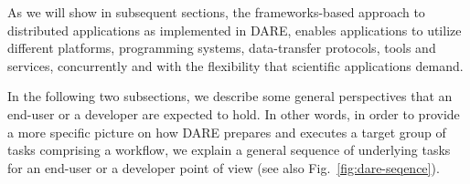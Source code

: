 \documentclass[]{svjour3}
\begin{document}
% 

   

As we will show in subsequent sections, the frameworks-based approach
to distributed applications as implemented in DARE, enables
applications to utilize different platforms, programming systems,
data-transfer protocols, tools and services, concurrently and with the
flexibility that scientific applications demand.



In the following two subsections, we describe some general perspectives that an end-user or a developer are expected to hold. In other words, in order to provide a more specific picture on how DARE prepares and executes a target group of tasks comprising a workflow, we explain a general sequence of underlying tasks for an end-user or a developer point of view (see also Fig.~\ref{fig:dare-seqence}).  
\end{document}
